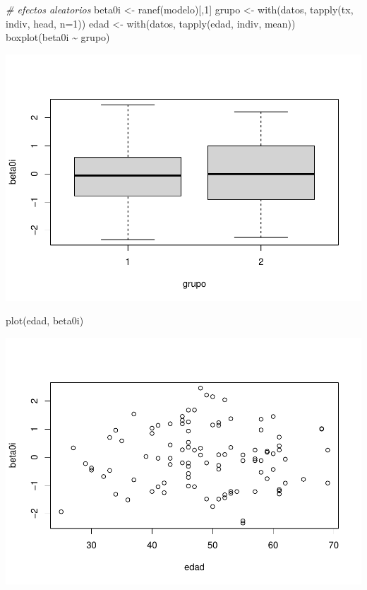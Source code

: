 \documentclass[
]{book}
\newenvironment{Shaded}{\begin{snugshade}}{\end{snugshade}}
\newcommand{\AttributeTok}[1]{\textcolor[rgb]{0.77,0.63,0.00}{#1}}
\newcommand{\CommentTok}[1]{\textcolor[rgb]{0.56,0.35,0.01}{\textit{#1}}}
\newcommand{\DecValTok}[1]{\textcolor[rgb]{0.00,0.00,0.81}{#1}}
\newcommand{\FunctionTok}[1]{\textcolor[rgb]{0.00,0.00,0.00}{#1}}
\newcommand{\NormalTok}[1]{#1}
\newcommand{\OtherTok}[1]{\textcolor[rgb]{0.56,0.35,0.01}{#1}}
\newcommand{\SpecialCharTok}[1]{\textcolor[rgb]{0.00,0.00,0.00}{#1}}
\begin{document}
\begin{Shaded}
\begin{Highlighting}[]
\CommentTok{\# efectos aleatorios}
\NormalTok{beta0i }\OtherTok{\textless{}{-}} \FunctionTok{ranef}\NormalTok{(modelo)[,}\DecValTok{1}\NormalTok{]}
\NormalTok{grupo }\OtherTok{\textless{}{-}} \FunctionTok{with}\NormalTok{(datos, }\FunctionTok{tapply}\NormalTok{(tx, indiv, head, }\AttributeTok{n=}\DecValTok{1}\NormalTok{))}
\NormalTok{edad }\OtherTok{\textless{}{-}} \FunctionTok{with}\NormalTok{(datos, }\FunctionTok{tapply}\NormalTok{(edad, indiv, mean))}
\FunctionTok{boxplot}\NormalTok{(beta0i }\SpecialCharTok{\textasciitilde{}}\NormalTok{ grupo)}
\end{Highlighting}
\end{Shaded}

\includegraphics{fig_out/unnamed-chunk-142-3.pdf}

\begin{Shaded}
\begin{Highlighting}[]
\FunctionTok{plot}\NormalTok{(edad, beta0i)}
\end{Highlighting}
\end{Shaded}

\includegraphics{fig_out/unnamed-chunk-142-4.pdf}
\end{document}
